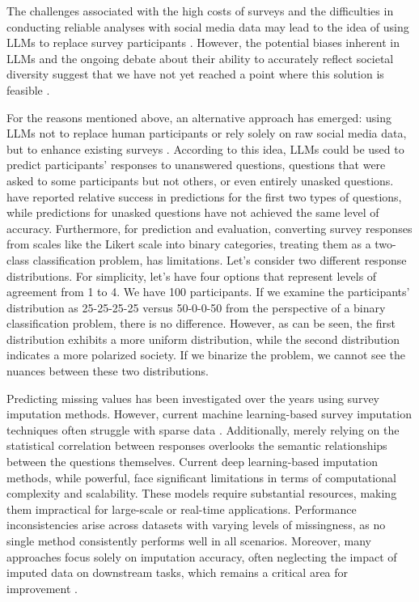 The challenges associated with the high costs of surveys and the difficulties in conducting reliable analyses with social media data may lead to the idea of using LLMs to replace survey participants \cite{sun2024random}. However, the potential biases inherent in LLMs and the ongoing debate about their ability to accurately reflect societal diversity suggest that we have not yet reached a point where this solution is feasible \cite{lee2024can, wang2024large,argyle2023out}.

For the reasons mentioned above, an alternative approach has emerged: using LLMs not to replace human participants or rely solely on raw social media data, but to enhance existing surveys \cite{kim2023ai}. According to this idea, LLMs could be used to predict participants' responses to unanswered questions, questions that were asked to some participants but not others, or even entirely unasked questions. \cite[Kim and Lee (2023)]{kim2023ai} have reported relative success in predictions for the first two types of questions, while predictions for unasked questions have not achieved the same level of accuracy. Furthermore, for prediction and evaluation, converting survey responses from scales like the Likert scale into binary categories, treating them as a two-class classification problem, has limitations. Let’s consider two different response distributions. For simplicity, let’s have four options that represent levels of agreement from 1 to 4. We have 100 participants. If we examine the participants' distribution as 25-25-25-25 versus 50-0-0-50 from the perspective of a binary classification problem, there is no difference. However, as can be seen, the first distribution exhibits a more uniform distribution, while the second distribution indicates a more polarized society. If we binarize the problem, we cannot see the nuances between these two distributions.

Predicting missing values has been investigated over the years using survey imputation methods. However, current machine learning-based survey imputation techniques often struggle with sparse data \cite{kim2023ai}. Additionally, merely relying on the statistical correlation between responses overlooks the semantic relationships between the questions themselves. Current deep learning-based imputation methods, while powerful, face significant limitations in terms of computational complexity and scalability. These models require substantial resources, making them impractical for large-scale or real-time applications. Performance inconsistencies arise across datasets with varying levels of missingness, as no single method consistently performs well in all scenarios. Moreover, many approaches focus solely on imputation accuracy, often neglecting the impact of imputed data on downstream tasks, which remains a critical area for improvement \cite{wang2024deep}. 

